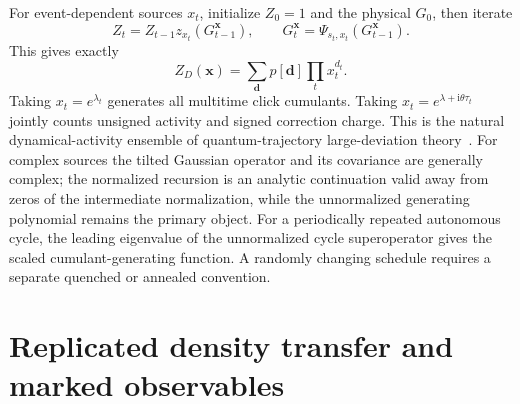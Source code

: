 \documentclass[
  aps,prx,twocolumn,superscriptaddress,longbibliography,
  nofootinbib,floatfix
]{revtex4-2}
\newcommand{\ii}{\mathrm{i}}
\theoremstyle{plain}
\theoremstyle{definition}
\begin{document}
For event-dependent sources \(x_t\), initialize \(Z_0=1\) and the physical
\(G_0\), then iterate
\begin{equation}
 Z_t=Z_{t-1}z_{x_t}(G_{t-1}^{\bm x}),
 \qquad
 G_t^{\bm x}=\Psi_{s_t,x_t}(G_{t-1}^{\bm x}).
 \label{eq:tilted-gaussian-recursion}
\end{equation}
This gives exactly
\begin{equation}
 Z_D(\bm x)=\sum_{\bm d}p[\bm d]\prod_tx_t^{d_t}.
 \label{eq:defect-generating-function}
\end{equation}
Taking \(x_t=e^{\lambda_t}\) generates all multitime click cumulants.  Taking
\(x_t=e^{\lambda+\ii\theta\tau_t}\) jointly counts unsigned activity and
signed correction charge.  This is the natural dynamical-activity ensemble of
quantum-trajectory large-deviation theory~\cite{GarrahanLesanovsky2010,Landi2024}.
For complex sources the tilted Gaussian operator and its covariance are
generally complex; the normalized recursion is an analytic continuation valid
away from zeros of the intermediate normalization, while the unnormalized
generating polynomial remains the primary object.
For a periodically repeated autonomous cycle, the leading eigenvalue of the
unnormalized cycle superoperator gives the scaled cumulant-generating
function.  A randomly changing schedule requires a separate quenched or
annealed convention.

\section{Replicated density transfer and marked observables}
\label{sec:replica-transfer}
\end{document}
